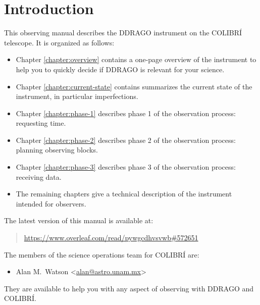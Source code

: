 \chapter{Introduction}

This observing manual describes the DDRAGO instrument on the COLIBRÍ telescope. It is organized as follows:

\begin{itemize}
\item Chapter \ref{chapter:overview} contains a one-page overview of the instrument to help you to quickly decide if DDRAGO is relevant for your science. 
\item Chapter \ref{chapter:current-state} contains summarizes the current state of the instrument, in particular imperfections. 
\item Chapter \ref{chapter:phase-1} describes phase 1 of the observation process: requesting time.
\item Chapter \ref{chapter:phase-2} describes phase 2 of the observation process: planning observing blocks.
\item Chapter \ref{chapter:phase-3} describes phase 3 of the observation process: receiving data.
\item The remaining chapters give a technical description of the instrument intended for observers.
\end{itemize}

The latest version of this manual is available at:

\begin{quote}
\url{https://www.overleaf.com/read/pywgcdhvsvwb#572651}
\end{quote}
The members of the science operations team for COLIBRÍ are:
\begin{itemize}
    \item Alan M.\ Watson <\href{mailto:alan@astro.unam.mx}{alan@astro.unam.mx}>
\end{itemize}
They are available to help you with any aspect of observing with DDRAGO and COLIBRÍ.